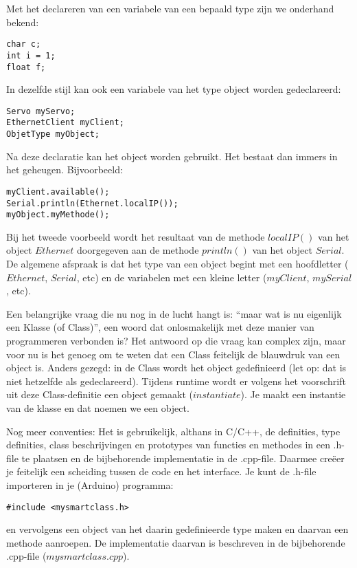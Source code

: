 Met het declareren van een variabele van een bepaald type zijn we onderhand bekend:
\begin{lstlisting}[language=Arduino]
char c;
int i = 1;
float f;
\end{lstlisting}

In dezelfde stijl kan ook een variabele van het type object worden gedeclareerd:

\begin{lstlisting}[language=Arduino]
Servo myServo;
EthernetClient myClient;
ObjetType myObject;
\end{lstlisting}

Na deze declaratie kan het object worden gebruikt. Het bestaat dan immers in het geheugen. Bijvoorbeeld:
\begin{lstlisting}[language=Arduino]
myClient.available();
Serial.println(Ethernet.localIP());
myObject.myMethode();
\end{lstlisting}

Bij het tweede voorbeeld wordt het resultaat van de methode $localIP()$ van het object $Ethernet$ doorgegeven aan de methode $println()$ van het object $Serial$.
De algemene afspraak is dat het type van een object begint met een hoofdletter ($Ethernet$, $Serial$, etc) en de variabelen met een kleine letter ($myClient$, $mySerial$, etc).\newline \newline

Een belangrijke vraag die nu nog in de lucht hangt is: “maar wat is nu eigenlijk een Klasse (of Class)”, een woord dat onlosmakelijk met deze manier van programmeren verbonden is? Het antwoord op die vraag kan complex zijn, maar voor nu is het genoeg om te weten dat een Class feitelijk de blauwdruk van een object is. Anders gezegd: in de Class wordt het object gedefinieerd (let op: dat is niet hetzelfde als gedeclareerd). Tijdens runtime wordt er volgens het voorschrift uit deze Class-definitie een object gemaakt ($instantiate$). Je maakt een instantie van de klasse en dat noemen we een object.\newline \newline

Nog meer conventies:\newline
Het is gebruikelijk, althans in C/C++, de definities, type definities, class beschrijvingen en prototypes van functies en methodes in een .h-file te plaatsen en de bijbehorende implementatie in de .cpp-file. Daarmee creëer je feitelijk een scheiding tussen de code en het interface. Je kunt de .h-file importeren in je (Arduino) programma:
\begin{lstlisting}[language=Arduino]
#include <mysmartclass.h>
\end{lstlisting}
en vervolgens een object van het daarin gedefinieerde type maken en daarvan een methode aanroepen. De implementatie daarvan is beschreven in de bijbehorende .cpp-file ($mysmartclass.cpp$). \newline \newline

